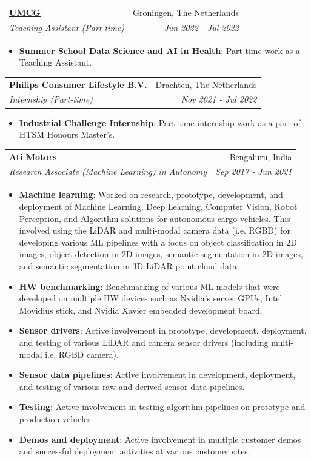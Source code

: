 \documentclass[letterpaper,11pt]{article}
\makeatletter
\newcommand{\resumeItem}[2]{
    \item\small{
        \textbf{#1}{: #2 \vspace{-2pt}}
    }
}
\newcommand{\resumeSubheading}[4]{
    \vspace{-1pt}\item
    \begin{tabular*}{0.97\textwidth}{l@{\extracolsep{\fill}}r}
        \textbf{#1} & #2 \\
        \textit{\small#3} & \textit{\small #4} \\
    \end{tabular*}\vspace{-5pt}
}
\newcommand{\resumeSubHeadingListStart}{\begin{itemize}[leftmargin=*]}
\newcommand{\resumeSubHeadingListEnd}{\end{itemize}}
\makeatother
\begin{document}
        \resumeSubheading{\underline{\href{https://www.umcg.nl/}{UMCG}}}{Groningen, The Netherlands}{Teaching Assistant (Part-time)}{Jun 2022 - Jul 2022}
            \resumeSubHeadingListStart
                \resumeItem{\href{https://www.rug.nl/research/gradschool-medical-sciences/summer-schools/data-science-and-ai/}{Summer School Data Science and AI in Health}}{Part-time work as a Teaching Assistant.}
            \resumeSubHeadingListEnd

        \resumeSubheading{\underline{{Philips Consumer Lifestyle B.V.}}}{Drachten, The Netherlands}{Internship (Part-time)}{Nov 2021 - Jul 2022}
            \resumeSubHeadingListStart
                \resumeItem{{Industrial Challenge Internship}}{Part-time internship work as a part of HTSM Honours Master's.}
            \resumeSubHeadingListEnd

        \resumeSubheading{\underline{\href{https://www.atimotors.com/}{Ati Motors}}}{Bengaluru, India}{Research Associate (Machine Learning) in Autonomy}{Sep 2017 - Jun 2021}
            \resumeSubHeadingListStart
                \resumeItem{Machine learning}
                {Worked on research, prototype, development, and deployment of Machine Learning, Deep Learning, Computer Vision, Robot Perception, and Algorithm solutions for autonomous cargo vehicles. This involved using the LiDAR and multi-modal camera data (i.e. RGBD) for developing various ML pipelines with a focus on object classification in 2D images, object detection in 2D images, semantic segmentation in 2D images, and semantic segmentation in 3D LiDAR point cloud data.}
                \resumeItem{HW benchmarking}{Benchmarking of various ML models that were developed on multiple HW devices such as Nvidia's server GPUs, Intel Movidius stick, and Nvidia Xavier embedded development board.}
                \resumeItem{Sensor drivers}{Active involvement in prototype, development, deployment, and testing of various LiDAR and camera sensor drivers (including multi-modal i.e. RGBD camera).}
                \resumeItem{Sensor data pipelines}{Active involvement in development, deployment, and testing of various raw and derived sensor data pipelines.}
                \resumeItem{Testing}{Active involvement in testing algorithm pipelines on prototype and production vehicles.}
                \resumeItem{Demos and deployment}{Active involvement in multiple customer demos and successful deployment activities at various customer sites.}
            \resumeSubHeadingListEnd
\end{document}
